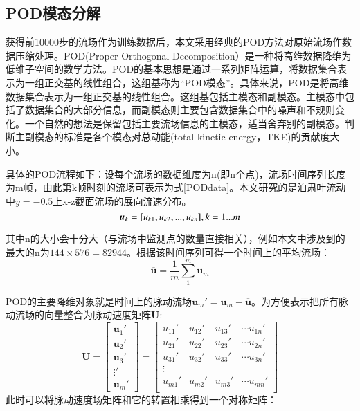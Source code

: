 \subsection{POD模态分解}
获得前10000步的流场作为训练数据后，本文采用经典的POD方法对原始流场作数据压缩处理。POD(Proper Orthogonal Decomposition）是一种将高维数据降维为低维子空间的数学方法。POD的基本思想是通过一系列矩阵运算，将数据集合表示为一组正交基的线性组合，这组基称为“POD模态”。具体来说，POD是将高维数据集合表示为一组正交基的线性组合。这组基包括主模态和副模态。主模态中包括了数据集合的大部分信息，而副模态则主要包含数据集合中的噪声和不规则变化。一个自然的想法是保留包括主要流场信息的主模态，适当舍弃别的副模态。判断主副模态的标准是各个模态对总动能(total kinetic energy，TKE)的贡献度大小。

具体的POD流程如下：设每个流场的数据维度为n(即n个点)，流场时间序列长度为m帧，由此第k帧时刻的流场可表示为式\ref{PODdata}。本文研究的是泊肃叶流动中$y = -0.5$上x-z截面流场的展向流速分布。
\begin{equation}
\bm u_k = [u_{k1},u_{k2},...,u_{kn}], k = 1...m\\
\label{PODdata}
\end{equation}

其中n的大小会十分大（与流场中监测点的数量直接相关），例如本文中涉及到的最大的n为$144\times576 = 82944$。根据该时间序列可得一个时间上的平均流场：
\begin{equation}
\overline{\bm u} = \frac{1}{m}\sum_{1}^{m} \bm u_m
\end{equation}

POD的主要降维对象就是时间上的脉动流场$\bm u_m' = \bm u_m - \overline{\bm u}$。为方便表示把所有脉动流场的向量整合为脉动速度矩阵$\bm U$:
$$
\bm U = 
\begin{bmatrix}
\bm u_1'\\
\bm u_2'\\
\bm u_3'\\
\vdots'\\
\bm u_m'
\end{bmatrix}
 = 
\begin{bmatrix}
u_{11}' & u_{12}' & u_{13}' & \cdots u_{1n}'\\
u_{21}' & u_{22}' & u_{23}' & \cdots u_{2n}'\\
u_{31}' & u_{32}' & u_{33}' & \cdots u_{3n}'\\
\vdots\\
u_{m1}' & u_{m2}' & u_{m3}' & \cdots u_{mn}'\\
\end{bmatrix}
\label{PODmat}
$$
此时可以将脉动速度场矩阵和它的转置相乘得到一个对称矩阵：

